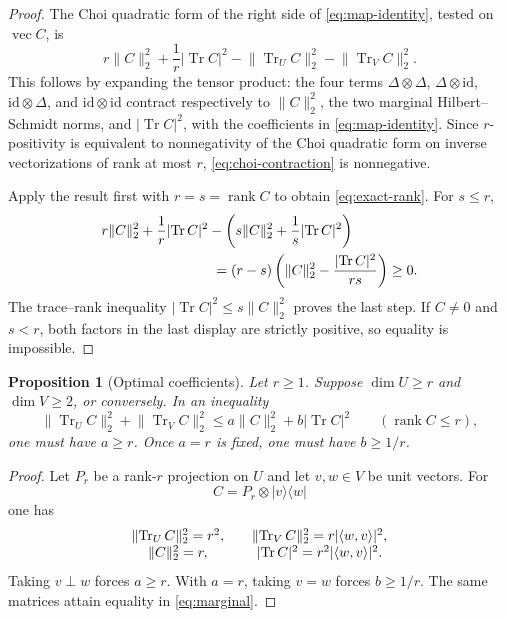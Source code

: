 \documentclass[11pt,reqno]{amsart}
\newtheorem{proposition}[theorem]{Proposition}
\theoremstyle{remark}
\DeclareMathOperator{\Tr}{Tr}
\DeclareMathOperator{\rank}{rank}
\newcommand{\id}{\mathrm{id}}
\newcommand{\ip}[2]{\langle #1,#2\rangle}
\newcommand{\norm}[1]{\lVert #1\rVert}
\newcommand{\abs}[1]{\lvert #1\rvert}
\newcommand{\ketbra}[2]{\lvert #1\rangle\!\langle #2\rvert}
\newcommand{\vecop}{\operatorname{vec}}
\begin{document}
\begin{proof}
The Choi quadratic form of the right side of \cref{eq:map-identity}, tested
on $\vecop C$, is
\begin{equation}
\label{eq:choi-contraction}
  r\norm C_2^2+\frac1r\abs{\Tr C}^2
  -\norm{\Tr_U C}_2^2-\norm{\Tr_V C}_2^2.
\end{equation}
This follows by expanding the tensor product: the four terms
$\Delta\otimes\Delta$, $\Delta\otimes\id$, $\id\otimes\Delta$, and
$\id\otimes\id$ contract respectively to
$\norm C_2^2$, the two marginal Hilbert--Schmidt norms, and
$\abs{\Tr C}^2$, with the coefficients in
\cref{eq:map-identity}.  Since $r$-positivity is equivalent to
nonnegativity of the Choi quadratic form on inverse vectorizations of rank at
most $r$, \cref{eq:choi-contraction} is nonnegative.

Apply the result first with $r=s=\rank C$ to obtain
\cref{eq:exact-rank}.  For $s\le r$,
\begin{align*}
 &r\norm C_2^2+\frac1r\abs{\Tr C}^2
 -\left(s\norm C_2^2+\frac1s\abs{\Tr C}^2\right)\\
 &\hspace{28mm}=(r-s)
   \left(\norm C_2^2-\frac{\abs{\Tr C}^2}{rs}\right)\ge0.
\end{align*}
The trace--rank inequality $\abs{\Tr C}^2\le s\norm C_2^2$ proves the
last step.  If $C\ne0$ and $s<r$, both factors in the last display are
strictly positive, so equality is impossible.
\end{proof}

\begin{proposition}[Optimal coefficients]
\label{prop:optimal}
Let $r\ge1$.  Suppose $\dim U\ge r$ and $\dim V\ge2$, or conversely.  In an inequality
\[
  \norm{\Tr_U C}_2^2+\norm{\Tr_V C}_2^2
  \le a\norm C_2^2+b\abs{\Tr C}^2
  \qquad(\rank C\le r),
\]
one must have $a\ge r$.  Once $a=r$ is fixed, one must have
$b\ge1/r$.
\end{proposition}

\begin{proof}
Let $P_r$ be a rank-$r$ projection on $U$ and let $v,w\in V$ be unit
vectors.  For
\[
  C=P_r\otimes\ketbra{v}{w}
\]
one has
\[
\begin{array}{c@{\qquad}c}
  \norm{\Tr_U C}_2^2=r^2,
  &\norm{\Tr_V C}_2^2=r\abs{\ip wv}^2,\\
  \norm C_2^2=r,
  &\abs{\Tr C}^2=r^2\abs{\ip wv}^2.
\end{array}
\]
Taking $v\perp w$ forces $a\ge r$.  With $a=r$, taking $v=w$ forces
$b\ge1/r$.  The same matrices attain equality in \cref{eq:marginal}.
\end{proof}
\end{document}
